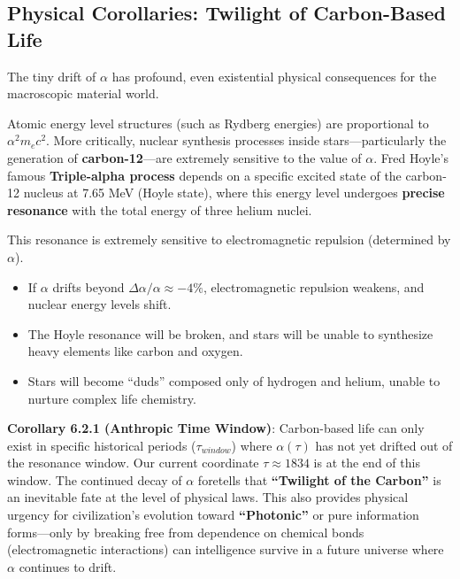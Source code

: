\subsection{Physical Corollaries: Twilight of Carbon-Based Life}

The tiny drift of $\alpha$ has profound, even existential physical consequences for the macroscopic material world.

Atomic energy level structures (such as Rydberg energies) are proportional to $\alpha^2 m_e c^2$. More critically, nuclear synthesis processes inside stars---particularly the generation of \textbf{carbon-12}---are extremely sensitive to the value of $\alpha$.
Fred Hoyle's famous \textbf{Triple-alpha process} depends on a specific excited state of the carbon-12 nucleus at 7.65 MeV (Hoyle state), where this energy level undergoes \textbf{precise resonance} with the total energy of three helium nuclei.

This resonance is extremely sensitive to electromagnetic repulsion (determined by $\alpha$).

\begin{itemize}
\item If $\alpha$ drifts beyond $\Delta \alpha / \alpha \approx -4\%$, electromagnetic repulsion weakens, and nuclear energy levels shift.
\item The Hoyle resonance will be broken, and stars will be unable to synthesize heavy elements like carbon and oxygen.
\item Stars will become ``duds'' composed only of hydrogen and helium, unable to nurture complex life chemistry.
\end{itemize}

\textbf{Corollary 6.2.1 (Anthropic Time Window)}:
Carbon-based life can only exist in specific historical periods ($\tau_{window}$) where $\alpha(\tau)$ has not yet drifted out of the resonance window. Our current coordinate $\tau \approx 1834$ is at the end of this window. The continued decay of $\alpha$ foretells that \textbf{``Twilight of the Carbon''} is an inevitable fate at the level of physical laws. This also provides physical urgency for civilization's evolution toward \textbf{``Photonic''} or pure information forms---only by breaking free from dependence on chemical bonds (electromagnetic interactions) can intelligence survive in a future universe where $\alpha$ continues to drift.
